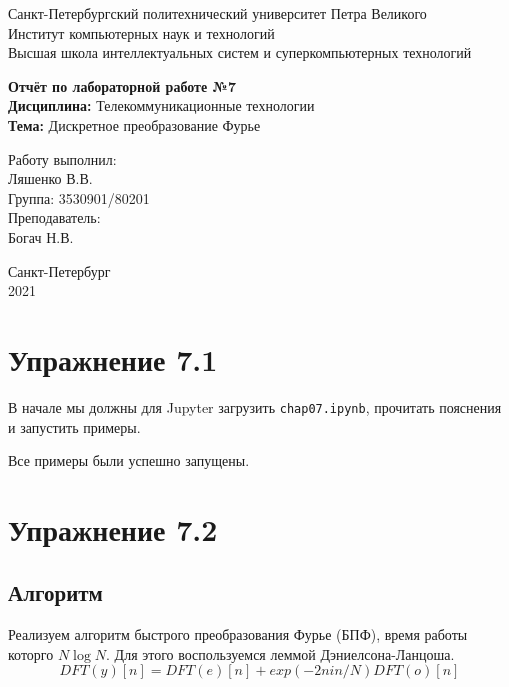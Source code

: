 \documentclass[a4paper,12pt]{report}
\begin{document}
 

\begin{titlepage}
\newpage
	\begin{center}
		\large Санкт-Петербургский политехнический университет Петра Великого\\
		Институт компьютерных наук и технологий\\
		Высшая школа интеллектуальных систем и суперкомпьютерных технологий\\
	\end{center}
\vspace{7cm}

\begin{center}
		\large \textbf{Отчёт по лабораторной работе №7} \\
		\textbf{Дисциплина:} Телекоммуникационные технологии\\
		\textbf{Тема:} Дискретное преобразование Фурье
\end{center}
\vspace{4cm}
	
\begin{flushright}
		\large Работу выполнил:\\ Ляшенко В.В.\\
		Группа: 3530901/80201\\
		Преподаватель:\\ Богач Н.В.
\end{flushright}

\vspace{\fill}
\begin{center}
	\large Санкт-Петербург\\ 2021
	\end{center}
\end{titlepage}

\tableofcontents
\listoffigures
\lstlistoflistings

\chapter{Упражнение 7.1}
    В начале мы должны для Jupyter загрузить \texttt{chap07.ipynb}, прочитать пояснения и запустить примеры.
    
    Все примеры были успешно запущены.

\chapter{Упражнение 7.2} 
\section{Алгоритм}
    Реализуем алгоритм быстрого преобразования Фурье (БПФ), время работы которго $N \log N$. Для этого воспользуемся леммой Дэниелсона-Ланцоша. 
\begin{equation}
       DFT(y)[n] = DFT(e)[n]+exp(-2nin/N)DFT(o)[n]
\end{equation}
\end{document}
